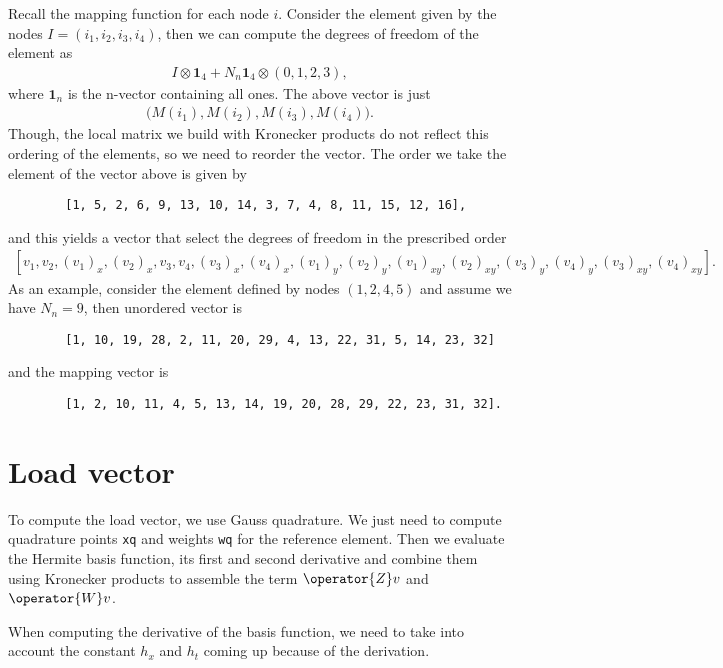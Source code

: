 \documentclass[]{report}
\begin{document}
    Recall the mapping function for each node $i$. Consider the element given by the nodes $I = (i_1, i_2, i_3, i_4)$, then we can compute the degrees of freedom of the element as
    \begin{align*}
        I \otimes \bm{1}_4 + N_n \bm{1}_4 \otimes (0,1,2,3),
    \end{align*}
    where $\bm{1}_n$ is the n-vector containing all ones. The above vector is just
    \begin{align*}
        \big(M(i_1), M(i_2), M(i_3), M(i_4)\big).
    \end{align*}
    Though, the local matrix we build with Kronecker products do not reflect this ordering of the elements, so we need to reorder the vector. The order we take the element of the vector above is given by
    \begin{verbatim}
        [1, 5, 2, 6, 9, 13, 10, 14, 3, 7, 4, 8, 11, 15, 12, 16],
    \end{verbatim}
    and this yields a vector that select the degrees of freedom in the prescribed order
    \begin{align*}
        \left[
            v_1, v_2, (v_1)_x, (v_2)_x,
            v_3, v_4, (v_3)_x, (v_4)_x,
            (v_1)_y, (v_2)_y, (v_1)_{xy}, (v_2)_{xy},
            (v_3)_y, (v_4)_y, (v_3)_{xy}, (v_4)_{xy}
            \right].
    \end{align*}
    As an example, consider the element defined by nodes $(1,2,4,5)$ and assume we have $N_n = 9$, then unordered vector is
    \begin{verbatim}
        [1, 10, 19, 28, 2, 11, 20, 29, 4, 13, 22, 31, 5, 14, 23, 32]
    \end{verbatim}
    and the mapping vector is
    \begin{verbatim}
        [1, 2, 10, 11, 4, 5, 13, 14, 19, 20, 28, 29, 22, 23, 31, 32].
    \end{verbatim}

    \section*{Load vector}
    To compute the load vector, we use Gauss quadrature. We just need to compute quadrature points \texttt{xq} and weights \texttt{wq} for the reference element. Then we evaluate the Hermite basis function, its first and second derivative and combine them using Kronecker products to assemble the term $\operator{Z} v$ and $\operator{W} v$.
    
    When computing the derivative of the basis function, we need to take into account the constant $h_x$ and $h_t$ coming up because of the derivation. 
\end{document}
